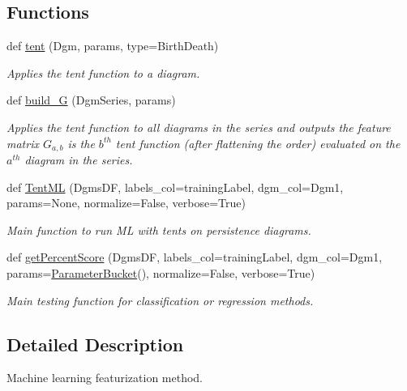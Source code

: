 \subsection*{Functions}
\begin{DoxyCompactItemize}
\item 
def \hyperlink{namespaceteaspoon_1_1_m_l_1_1tents_a6a7e3aad0e7229895aa9f204df7e6304}{tent} (Dgm, params, type=\textquotesingle{}Birth\+Death\textquotesingle{})
\begin{DoxyCompactList}\small\item\em Applies the tent function to a diagram. \end{DoxyCompactList}\item 
def \hyperlink{namespaceteaspoon_1_1_m_l_1_1tents_a2a752f63d55c359140dc7dbbf8fc9b45}{build\+\_\+G} (Dgm\+Series, params)
\begin{DoxyCompactList}\small\item\em Applies the tent function to all diagrams in the series and outputs the feature matrix $G_{a,b}$ is the $b^{th}$ tent function (after flattening the order) evaluated on the $a^{th}$ diagram in the series. \end{DoxyCompactList}\item 
def \hyperlink{namespaceteaspoon_1_1_m_l_1_1tents_a44f03361919ae7223766344ad9f620df}{Tent\+ML} (Dgms\+DF, labels\+\_\+col=\textquotesingle{}training\+Label\textquotesingle{}, dgm\+\_\+col=\textquotesingle{}Dgm1\textquotesingle{}, params=None, normalize=False, verbose=True)
\begin{DoxyCompactList}\small\item\em Main function to run ML with tents on persistence diagrams. \end{DoxyCompactList}\item 
def \hyperlink{namespaceteaspoon_1_1_m_l_1_1tents_a227e874560c3fe1181643b41f65dc92c}{get\+Percent\+Score} (Dgms\+DF, labels\+\_\+col=\textquotesingle{}training\+Label\textquotesingle{}, dgm\+\_\+col=\textquotesingle{}Dgm1\textquotesingle{}, params=\hyperlink{classteaspoon_1_1_m_l_1_1tents_1_1_parameter_bucket}{Parameter\+Bucket}(), normalize=False, verbose=True)
\begin{DoxyCompactList}\small\item\em Main testing function for classification or regression methods. \end{DoxyCompactList}\end{DoxyCompactItemize}


\subsection{Detailed Description}
Machine learning featurization method. 

